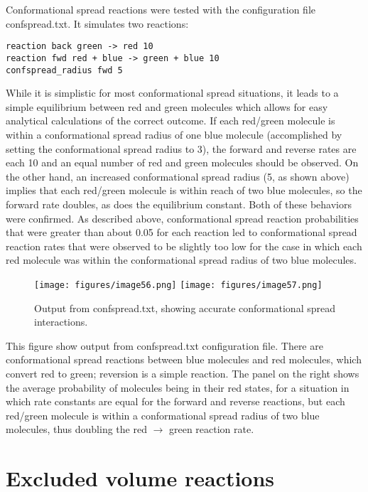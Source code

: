 \documentclass {scrbook}
\begin{document}
Conformational spread reactions were tested with the configuration file confspread.txt. It simulates two reactions:
\begin{lstlisting}[style=SSAC]
reaction back green -> red 10
reaction fwd red + blue -> green + blue 10
confspread_radius fwd 5
\end{lstlisting}
While it is simplistic for most conformational spread situations, it leads to a simple equilibrium between red and green molecules which allows for easy analytical calculations of the correct outcome. If each red/green molecule is within a conformational spread radius of one blue molecule (accomplished by setting the conformational spread radius to 3), the forward and reverse rates are each 10 and an equal number of red and green molecules should be observed. On the other hand, an increased conformational spread radius (5, as shown above) implies that each red/green molecule is within reach of two blue molecules, so the forward rate doubles, as does the equilibrium constant. Both of these behaviors were confirmed. As described above, conformational spread reaction probabilities that were greater than about 0.05 for each reaction led to conformational spread reaction rates that were observed to be slightly too low for the case in which each red molecule was within the conformational spread radius of two blue molecules.

\begin{figure}[h]
\centering
\texttt{[image: figures/image56.png]}
\texttt{[image: figures/image57.png]}
\caption{Output from confspread.txt, showing accurate conformational spread interactions.}
\label{fig:confspread}
\end{figure}

This figure show output from confspread.txt configuration file. There are conformational spread reactions between blue molecules and red molecules, which convert red to green; reversion is a simple reaction. The panel on the right shows the average probability of molecules being in their red states, for a situation in which rate constants are equal for the forward and reverse reactions, but each red/green molecule is within a conformational spread radius of two blue molecules, thus doubling the red $\rightarrow$ green reaction rate.

\section{Excluded volume reactions}
\end{document}
